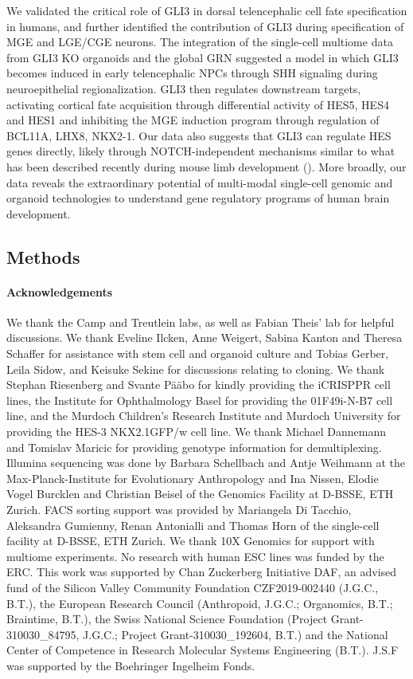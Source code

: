 We validated the critical role of GLI3 in dorsal telencephalic cell fate specification in humans, and further identified the contribution of GLI3 during specification of MGE and LGE/CGE neurons. The integration of the single-cell multiome data from GLI3 KO organoids and the global GRN suggested a model in which GLI3 becomes induced in early telencephalic NPCs through SHH signaling during neuroepithelial regionalization. GLI3 then regulates downstream targets, activating cortical fate acquisition through differential activity of HES5, HES4 and HES1 and inhibiting the MGE induction program through regulation of BCL11A, LHX8, NKX2-1. Our data also suggests that GLI3 can regulate HES genes directly, likely through NOTCH-independent mechanisms similar to what has been described recently during mouse limb development (\cite{sharma_hes1_2021}). More broadly, our data reveals the extraordinary potential of multi-modal single-cell genomic and organoid technologies to understand gene regulatory programs of human brain development.


\subsection{Methods}

\paragraph{Acknowledgements}
We thank the Camp and Treutlein labs, as well as Fabian Theis' lab for helpful discussions. We thank Eveline Ilcken, Anne Weigert, Sabina Kanton and Theresa Schaffer for assistance with stem cell and organoid culture and Tobias Gerber, Leila Sidow, and Keisuke Sekine for discussions relating to cloning. We thank Stephan Riesenberg and Svante Pääbo for kindly providing the iCRISPPR cell lines, the Institute for Ophthalmology Basel for providing the 01F49i-N-B7 cell line, and the Murdoch Children's Research Institute and Murdoch University for providing the HES-3 NKX2.1GFP/w cell line. We thank Michael Dannemann and Tomislav Maricic for providing genotype information for demultiplexing. Illumina sequencing was done by Barbara Schellbach and Antje Weihmann at the Max-Planck-Institute for Evolutionary Anthropology and Ina Nissen, Elodie Vogel Burcklen and Christian Beisel of the Genomics Facility at D-BSSE, ETH Zurich. FACS sorting support was provided by Mariangela Di Tacchio, Aleksandra Gumienny, Renan Antonialli and Thomas Horn of the single-cell facility at D-BSSE, ETH Zurich. We thank 10X Genomics for support with multiome experiments. No research with human ESC lines was funded by the ERC. This work was supported by Chan Zuckerberg Initiative DAF, an advised fund of the Silicon Valley Community Foundation CZF2019-002440 (J.G.C., B.T.), the European Research Council (Anthropoid, J.G.C.; Organomics, B.T.; Braintime, B.T.), the Swiss National Science Foundation (Project Grant-310030\_84795, J.G.C.; Project Grant-310030\_192604, B.T.) and the National Center of Competence in Research Molecular Systems Engineering (B.T.). J.S.F was supported by the Boehringer Ingelheim Fonds.
 
